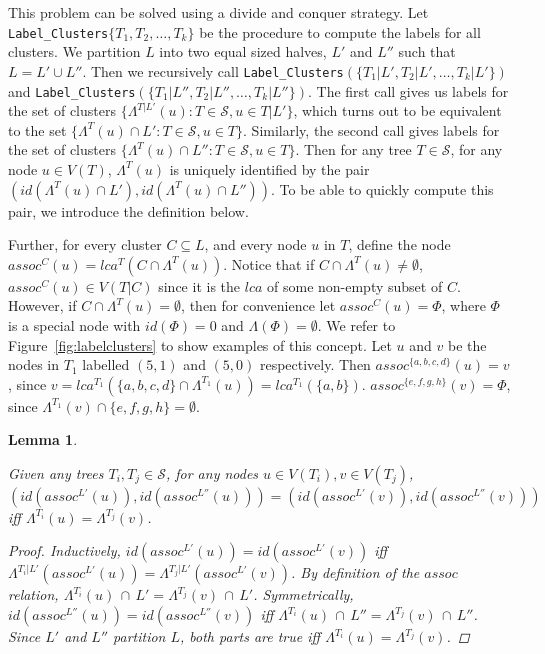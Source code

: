 \documentclass{article}
\newcommand{\leafset}{\Lambda}
\newtheorem{labelclusterscorrectness}[incompatibility]{Lemma}
\begin{document}
    This problem can be solved using a divide and conquer strategy. Let \texttt{Label\_Clusters}$\{T_1, T_2, \dots, T_k\}$ be the procedure to compute the labels for all clusters. We partition $L$ into two equal sized halves, $L'$ and $L''$ such that $L = L' \cup L''$. Then we recursively call \texttt{Label\_Clusters}$(\{T_1|L', T_2|L', \dots, T_k|L'\})$ and \texttt{Label\_Clusters}$(\{T_1|L'', T_2|L'', \dots, T_k|L''\})$. The first call gives us labels for the set of clusters $\{\leafset^{T|L'}(u) : T \in \mathcal{S}, u \in T|L'\}$, which turns out to be equivalent to the set $\{\leafset^{T}(u) \cap L' : T \in \mathcal{S}, u \in T\}$. Similarly, the second call gives labels for the set of clusters $\{\leafset^{T}(u) \cap L'' : T \in \mathcal{S}, u \in T\}$. Then for any tree $T \in \mathcal{S}$, for any node $u \in V(T)$, $\leafset^T(u)$ is uniquely identified by the pair $(id(\leafset^T(u) \cap L'), id(\leafset^T(u) \cap L''))$. To be able to quickly compute this pair, we introduce the definition below.

    Further, for every cluster $C \subseteq L$, and every node $u$ in $T$, define the node $assoc^C(u) = lca^T(C \cap \leafset^T(u))$. Notice that if $C \cap \leafset^T(u) \neq \emptyset$, $assoc^C(u) \in V(T|C)$ since it is the $lca$ of some non-empty subset of $C$. However, if $C \cap \leafset^T(u) = \emptyset$, then for convenience let $assoc^{C}(u) = \Phi$, where $\Phi$ is a special node with $id(\Phi) = 0$ and $\leafset(\Phi) = \emptyset$. We refer to Figure~\ref{fig:labelclusters} to show examples of this concept. Let $u$ and $v$ be the nodes in $T_1$ labelled $(5, 1)$ and $(5, 0)$ respectively. Then $assoc^{\{a, b, c, d\}}(u) = v$, since $v = lca^{T_1}(\{a, b, c, d\} \cap \leafset^{T_1}(u)) = lca^{T_1}(\{a, b\})$. $assoc^{\{e, f, g, h\}}(v) = \Phi$, since $\leafset^{T_1}(v) \cap \{e, f, g, h\} = \emptyset$.
    \newline

    \begin{labelclusterscorrectness}
        \label{lem:labelclusterscorrectness}

        Given any trees $T_i, T_j \in \mathcal{S}$, for any nodes $u \in V(T_i), v \in V(T_j)$, $(id(assoc^{L'}(u)), id(assoc^{L''}(u))) = (id(assoc^{L'}(v)), id(assoc^{L''}(v)))$ iff $\leafset^{T_i}(u) = \leafset^{T_j}(v)$.

        \begin{proof}
            Inductively, $id(assoc^{L'}(u)) = id(assoc^{L'}(v))$ iff $\leafset^{T_i|L'}(assoc^{L'}(u)) = \leafset^{T_j|L'}(assoc^{L'}(v))$. By definition of the $assoc$ relation, $\leafset^{T_i}(u)\, \cap\, L' = \leafset^{T_j}(v)\, \cap\, L'$. Symmetrically, $id(assoc^{L''}(u)) = id(assoc^{L''}(v))$ iff $\leafset^{T_i}(u)\, \cap\, L'' = \leafset^{T_j}(v)\, \cap\, L''$. Since $L'$ and $L''$ partition $L$, both parts are true iff $\leafset^{T_i}(u) = \leafset^{T_j}(v)$.
        \end{proof}
    \end{labelclusterscorrectness}
\end{document}
